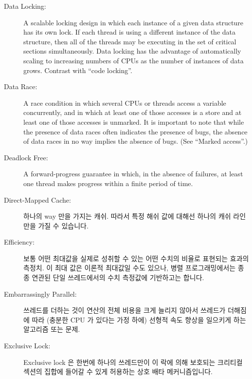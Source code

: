 \begin{description}
\item[Data Locking:]
	A scalable locking design in which each instance of a given
	data structure has its own lock.
	If each thread is using a different instance of the
	data structure, then all of the threads may be executing in
	the set of critical sections simultaneously.
	Data locking has the advantage of automatically scaling to
	increasing numbers of CPUs as the number of instances of
	data grows.
	Contrast with ``code locking''.
\item[Data Race:]
	A race condition in which several CPUs or threads access
	a variable concurrently, and in which at least one of those
	accesses is a store and at least one of those accesses
	is unmarked.
	It is important to note that while the presence of data races
	often indicates the presence of bugs, the absence of data races
	in no way implies the absence of bugs.
	(See ``Marked access''.)
\item[Deadlock Free:]
	A forward-progress guarantee in which, in the absence of
	failures, at least one thread makes progress within a finite
	period of time.

\fi

\item[Direct-Mapped Cache:]
	하나의 way 만을 가지는 캐쉬.
	따라서 특정 해쉬 값에 대해선 하나의 캐쉬 라인 만을 가질 수 있습니다.
\item[Efficiency:]
	보통 어떤 최대값을 실제로 성취할 수 있는 어떤 수치의 비율로 표현되는
	효과의 측정치.
	이 최대 값은 이론적 최대값일 수도 있으나, 병렬 프로그래밍에서는 종종
	연관된 단일 쓰레드에서의 수치 측정값에 기반하고는 합니다.
\item[Embarrassingly Parallel:]
	쓰레드를 더하는 것이 연산의 전체 비용을 크게 늘리지 않아서 쓰레드가
	더해짐에 따라 (충분한 CPU 가 있다는 가정 하에) 선형적 속도 향상을
	일으키게 하는 알고리즘 또는 문제.
\item[Exclusive Lock:]
	Exclusive lock 은 한번에 하나의 쓰레드만이 이 락에 의해 보호되는
	크리티컬 섹션의 집합에 들어갈 수 있게 허용하는 상호 배타
	메커니즘입니다.

\iffalse


\end{description}

